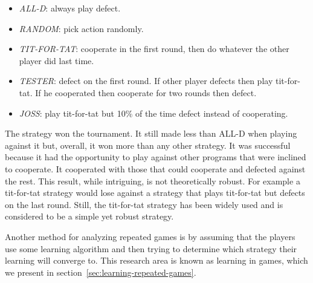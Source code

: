 \begin{itemize}
\item \emph{ALL-D}: always play defect.

\item \emph{RANDOM}: pick action randomly. 
  
\item \emph{TIT-FOR-TAT}: cooperate in the first round, then
  do whatever the other player did last time. 
  
\item \emph{TESTER}: defect on the first round. If other player
  defects then play tit-for-tat. If he cooperated then cooperate for
  two rounds then defect.
  
\item \emph{JOSS}: play tit-for-tat but 10\% of the time defect
  instead of cooperating.
\end{itemize}

The  strategy won the tournament. It still made less
than ALL-D when playing against it but, overall, it won more than any
other strategy. It was successful because it had the opportunity to
play against other programs that were inclined to cooperate. It
cooperated with those that could cooperate and defected against the
rest. This result, while intriguing, is not theoretically robust. For
example a tit-for-tat strategy would lose against a strategy that
plays tit-for-tat but defects on the last round. Still, the
tit-for-tat strategy has been widely used and is considered to be a
simple yet robust strategy.

\medskip

Another method for analyzing repeated games is by assuming that the
players use some learning algorithm and then trying to determine which
strategy their learning will converge to. This research area is known
as learning in games, which we present in
section~\ref{sec:learning-repeated-games}.



  
  
  
